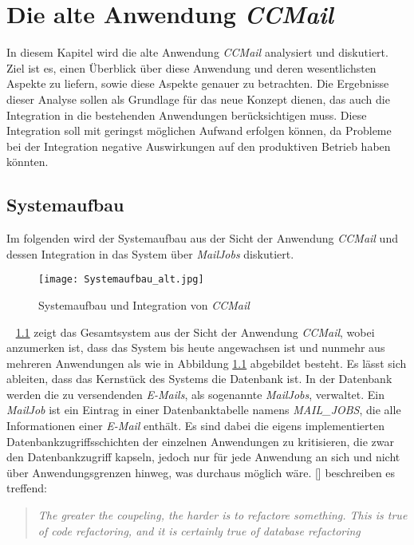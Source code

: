 \chapter{Die alte Anwendung \emph{CCMail}}
\label{cha:ccmail}
In diesem Kapitel wird die alte Anwendung \emph{CCMail} analysiert und diskutiert. Ziel ist es, einen Überblick über diese Anwendung und deren wesentlichsten Aspekte zu liefern, sowie diese Aspekte genauer zu betrachten. Die Ergebnisse dieser Analyse sollen als Grundlage für das neue Konzept dienen, das auch die Integration in die bestehenden Anwendungen berücksichtigen muss. Diese Integration soll mit geringst möglichen Aufwand erfolgen können, da Probleme bei der Integration negative Auswirkungen auf den produktiven Betrieb haben könnten. 

\section{Systemaufbau}
\label{sec:ccmail-systemaufbau}
Im folgenden wird der Systemaufbau aus der Sicht der Anwendung \emph{CCMail} und dessen Integration in das System über \emph{MailJobs} diskutiert. 
\begin{figure}[h]
\centering
\texttt{[image: Systemaufbau\_alt.jpg]} %
\caption{Systemaufbau und Integration von \emph{CCMail}}
\label{fig:ccmail-system-und-integration}
\end{figure}
\ \newpage
{} \ref{fig:ccmail-system-und-integration} zeigt das Gesamtsystem aus der Sicht der Anwendung \emph{CCMail}, wobei anzumerken ist, dass das System bis heute angewachsen ist und nunmehr aus mehreren Anwendungen als wie in Abbildung  \ref{fig:ccmail-system-und-integration} abgebildet besteht. Es lässt sich ableiten, dass das Kernstück des Systems die Datenbank ist. In der Datenbank werden die zu versendenden \emph{E-Mails}, als sogenannte \emph{MailJobs}, verwaltet. Ein \emph{MailJob} ist ein Eintrag in einer Datenbanktabelle namens \emph{MAIL\_JOBS}, die alle Informationen einer \emph{E-Mail} enthält. Es sind dabei die eigens implementierten Datenbankzugriffsschichten der einzelnen Anwendungen zu kritisieren, die zwar den Datenbankzugriff kapseln, jedoch nur für jede Anwendung an sich und nicht über Anwendungsgrenzen hinweg, was durchaus möglich wäre. [\cite[27]{refactoreDatabase}] beschreiben es treffend:
\begin{quote}
\emph{The greater the coupeling, the harder is to refactore something. This is true of code refactoring, and it is certainly true of database refactoring}
\end{quote}
